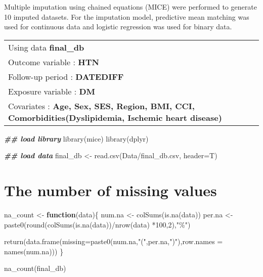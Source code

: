 \documentclass[
]{book}
\newenvironment{Shaded}{\begin{snugshade}}{\end{snugshade}}
\newcommand{\AttributeTok}[1]{\textcolor[rgb]{0.77,0.63,0.00}{#1}}
\newcommand{\ControlFlowTok}[1]{\textcolor[rgb]{0.13,0.29,0.53}{\textbf{#1}}}
\newcommand{\DecValTok}[1]{\textcolor[rgb]{0.00,0.00,0.81}{#1}}
\newcommand{\DocumentationTok}[1]{\textcolor[rgb]{0.56,0.35,0.01}{\textbf{\textit{#1}}}}
\newcommand{\FunctionTok}[1]{\textcolor[rgb]{0.00,0.00,0.00}{#1}}
\newcommand{\NormalTok}[1]{#1}
\newcommand{\OtherTok}[1]{\textcolor[rgb]{0.56,0.35,0.01}{#1}}
\newcommand{\SpecialCharTok}[1]{\textcolor[rgb]{0.00,0.00,0.00}{#1}}
\newcommand{\StringTok}[1]{\textcolor[rgb]{0.31,0.60,0.02}{#1}}
\theoremstyle{definition}
\theoremstyle{definition}
\theoremstyle{definition}
\theoremstyle{definition}
\theoremstyle{remark}
\begin{document}
Multiple imputation using chained equations (MICE) were performed to generate 10 imputed datasets. For the imputation model, predictive mean matching was used for continuous data and logistic regression was used for binary data.

\begin{longtable}[]{@{}l@{}}
\toprule()
\endhead
Using data \textbf{final\_db} \\
Outcome variable : \textbf{HTN} \\
Follow-up period : \textbf{DATEDIFF} \\
Exposure variable : \textbf{DM} \\
Covariates : \textbf{Age, Sex, SES, Region, BMI, CCI, Comorbidities(Dyslipidemia, Ischemic heart disease)} \\
\bottomrule()
\end{longtable}

\begin{Shaded}
\begin{Highlighting}[]
\DocumentationTok{\#\# load library}
\FunctionTok{library}\NormalTok{(mice)}
\FunctionTok{library}\NormalTok{(dplyr)}
\end{Highlighting}
\end{Shaded}

\begin{Shaded}
\begin{Highlighting}[]
\DocumentationTok{\#\# load data}
\NormalTok{final\_db }\OtherTok{\textless{}{-}} \FunctionTok{read.csv}\NormalTok{(}\StringTok{\textquotesingle{}Data/final\_db.csv\textquotesingle{}}\NormalTok{, }\AttributeTok{header=}\NormalTok{T)}
\end{Highlighting}
\end{Shaded}

\hypertarget{the-number-of-missing-values}{%
\section{The number of missing values}\label{the-number-of-missing-values}}

\begin{Shaded}
\begin{Highlighting}[]
\NormalTok{na\_count }\OtherTok{\textless{}{-}} \ControlFlowTok{function}\NormalTok{(data)\{}
\NormalTok{  num.na }\OtherTok{\textless{}{-}} \FunctionTok{colSums}\NormalTok{(}\FunctionTok{is.na}\NormalTok{(data))}
\NormalTok{  per.na }\OtherTok{\textless{}{-}} \FunctionTok{paste0}\NormalTok{(}\FunctionTok{round}\NormalTok{(}\FunctionTok{colSums}\NormalTok{(}\FunctionTok{is.na}\NormalTok{(data))}\SpecialCharTok{/}\FunctionTok{nrow}\NormalTok{(data) }\SpecialCharTok{*}\DecValTok{100}\NormalTok{,}\DecValTok{2}\NormalTok{),}\StringTok{"\%"}\NormalTok{)}
  
  \FunctionTok{return}\NormalTok{(}\FunctionTok{data.frame}\NormalTok{(}\AttributeTok{missing=}\FunctionTok{paste0}\NormalTok{(num.na,}\StringTok{"("}\NormalTok{,per.na,}\StringTok{")"}\NormalTok{),}\AttributeTok{row.names =} \FunctionTok{names}\NormalTok{(num.na)))}
\NormalTok{\}}

\FunctionTok{na\_count}\NormalTok{(final\_db)}
\end{Highlighting}
\end{Shaded}
\end{document}
